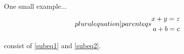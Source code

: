 \documentclass{article}
\begin{document}
One small example...
\begin{subequations} \label{parenteq} \label[pluralequation]{parenteqs}
	\begin{align}
		x + y = z \label{subeq1}
		\\
		a + b = c \label{subeq2}
	\end{align}
\end{subequations}

 consist of \cref{subeq1} and \cref{subeq2}.
\end{document}
